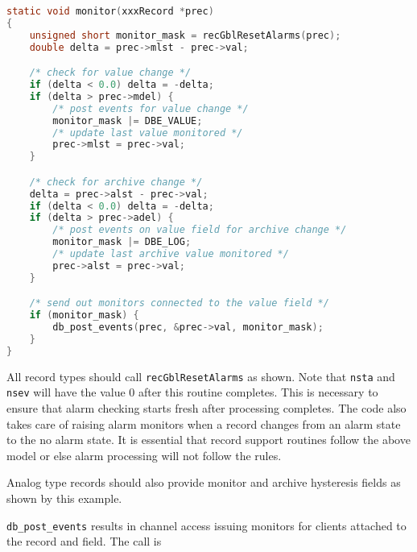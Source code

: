 \begin{lstlisting}[language=C]
static void monitor(xxxRecord *prec)
{
    unsigned short monitor_mask = recGblResetAlarms(prec);
    double delta = prec->mlst - prec->val;

    /* check for value change */
    if (delta < 0.0) delta = -delta;
    if (delta > prec->mdel) {
        /* post events for value change */
        monitor_mask |= DBE_VALUE;
        /* update last value monitored */
        prec->mlst = prec->val;
    }

    /* check for archive change */
    delta = prec->alst - prec->val;
    if (delta < 0.0) delta = -delta;
    if (delta > prec->adel) {
        /* post events on value field for archive change */
        monitor_mask |= DBE_LOG;
        /* update last archive value monitored */
        prec->alst = prec->val;
    }

    /* send out monitors connected to the value field */
    if (monitor_mask) {
        db_post_events(prec, &prec->val, monitor_mask);
    }
}
\end{lstlisting}

All record types should call \verb|recGblResetAlarms| as shown.
Note that \verb|nsta| and \verb|nsev| will have the value 0 after this routine completes.
This is necessary to ensure that alarm checking starts fresh after processing completes.
The code also takes care of raising alarm monitors when a record changes from an alarm state to the no alarm state.
It is essential that record support routines follow the above model or else alarm processing will not follow the rules.

Analog type records should also provide monitor and archive hysteresis fields as shown by this example.

\verb|db_post_events| results in channel access issuing monitors for clients attached to the record and field.
The call is

